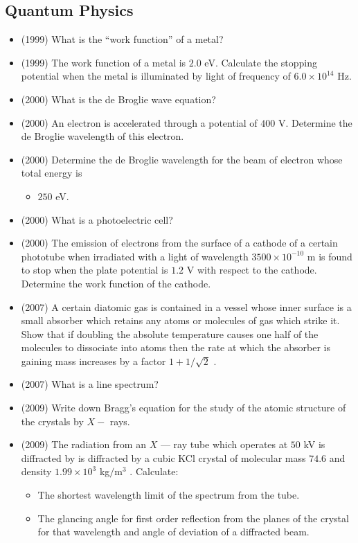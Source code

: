 \documentclass{article}
\begin{document}
\subsection{Quantum Physics}
\begin{itemize}
\item (1999)  What is the “work function” of a metal?
\item (1999)  The work function of a metal is $ 2.0$ eV. Calculate the stopping potential when the metal is illuminated by light of frequency of $ 6.0 \times 10^{14}$ Hz.
\item (2000)  What is the de Broglie wave equation?
\item (2000)  An electron is accelerated through a potential of $ 400$ V. Determine the de Broglie wavelength of this electron.
\item (2000)  Determine the de Broglie wavelength for the beam of electron whose total energy is
 \begin{itemize}
\item $ 250$ eV.
\end{itemize}
\item (2000)  What is a photoelectric cell?
\item (2000)  The emission of electrons from the surface of a cathode of a certain phototube when irradiated with a light of wavelength $ 3500 \times 10^{-10}$ m is found to stop when the plate potential is $ 1.2$ V with respect to the cathode. Determine the work function of the cathode.
\item (2007)  A certain diatomic gas is contained in a vessel whose inner surface is a small absorber which retains any atoms or molecules of gas which strike it.  Show that if doubling the absolute temperature causes one half of the molecules to dissociate into atoms then the rate at which the absorber is gaining mass increases by a factor $ 1+1/\sqrt{2}$ .
\item (2007)  What is a line spectrum? 
\item (2009)  Write down Bragg’s equation for the study of the atomic structure of the crystals by $ X-$ rays.
\item (2009)  The radiation from an $ X$ — ray tube which operates at $ 50$ kV is diffracted by is diffracted by a cubic KCl crystal of molecular mass $ 74.6$ and density $ 1.99 \times 10^{3}$ kg$/$m$ ^{3}$ .  Calculate:
 \begin{itemize}
\item The shortest wavelength limit of the spectrum from the tube.
\item The glancing angle for first order reflection from the planes of the crystal for that wavelength and angle of deviation of a diffracted beam.

\end{itemize}
\end{itemize}
\end{document}
